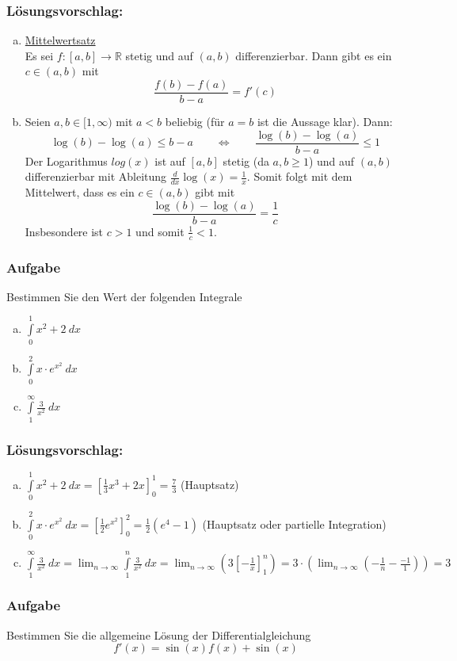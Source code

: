 \documentclass[a4paper,11pt]{scrartcl}
\newcounter{auf}
\newcommand{\Aufgabe}%
        {\addtocounter{auf}{1} \subsubsection*{\rmfamily  Aufgabe \theauf \hspace{1em}} }
\newcommand{\RR}{\mathbb{R}}
\begin{document}
\subsubsection*{Lösungsvorschlag:}
\begin{enumerate}[a)]
\item \underline{Mittelwertsatz}\\ Es sei $f:[a,b] \to \RR$ stetig und auf $(a,b)$ differenzierbar. Dann gibt es ein $c \in (a,b)$ mit
$$
\frac{f(b)-f(a)}{b-a}=f'(c)
$$
\item  Seien $a,b \in [1,\infty)$ mit $a< b$ beliebig (für $a=b$ ist die Aussage klar). Dann:
	$$
	\log(b)-\log(a) \le b-a \qquad \Longleftrightarrow \qquad \frac{\log(b)-\log(a)}{b-a} \le 1
	$$
	Der Logarithmus $log(x)$ ist auf $[a,b]$ stetig (da $a,b \ge 1$) und auf $(a,b)$ differenzierbar mit Ableitung $\frac{d}{dx}\log(x)=\frac{1}{x}$. Somit folgt mit dem Mittelwert, dass es ein $c\in (a,b)$ gibt mit 
		$$
		 \frac{\log(b)-\log(a)}{b-a} = \frac{1}{c}
	$$
Insbesondere ist $c>1$ und somit $ \frac{1}{c} < 1$.
\end{enumerate}

\newpage
\Aufgabe
Bestimmen Sie den Wert der folgenden Integrale
\begin{enumerate}[a)]
\item $\displaystyle\int \limits_{0}^1 x^2+2\ dx$
\item $\displaystyle\int \limits_{0}^2 x\cdot e^{x^2} \ dx$
\item $\displaystyle\int \limits_{1}^\infty \frac{3}{x^2}\ dx$
\end{enumerate}
%
\subsubsection*{Lösungsvorschlag:}

\begin{enumerate}[a)]
\item $\displaystyle\int \limits_{0}^1 x^2+2\ dx=[\frac{1}{3}x^3+2x]_0^1=\frac{7}{3}$ (Hauptsatz)
\item $\displaystyle\int \limits_{0}^2 x\cdot e^{x^2} \ dx=[\frac{1}{2}e^{x^2}]_0^2=\frac{1}{2}(e^4-1)$ (Hauptsatz oder partielle Integration)
\item $\displaystyle\int \limits_{1}^\infty \frac{3}{x^2}\ dx=\lim_{n \to \infty}\displaystyle\int \limits_{1}^n \frac{3}{x^2}\ dx=\lim_{n \to \infty} (3[-\frac{1}{x}]_1^n)=3\cdot ( \lim_{n \to \infty}(-\frac{1}{n}-\frac{-1}{1})) =3$
\end{enumerate}
\newpage
\Aufgabe
Bestimmen Sie die allgemeine Lösung der Differentialgleichung
$$
f'(x)=\sin(x)f(x)+\sin(x)
$$
\end{document}
